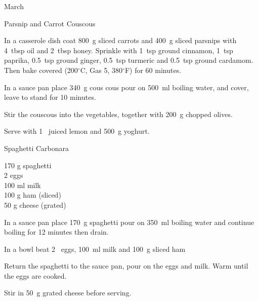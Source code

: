 \begin{menu}{March}
\begin{recipe}{2}{Parsnip and Carrot Couscous}
    \begin{instructions}
    \item 
        In a casserole dish coat
        800~g sliced carrots
        and
        400~g sliced parsnips
        with
        4~tbsp  oil
        and
        2~tbsp  honey.
        Sprinkle with
        1~tsp  ground cinnamon,
        1~tsp  paprika,
        0.5~tsp  ground ginger,
        0.5~tsp  turmeric
        and
        0.5~tsp  ground cardamom.
        Then bake covered
        (200$^{\circ}$C, Gas 5, 380$^{\circ}$F)
        for 60 minutes.
      \item 
    In a
    sauce pan 
    place
    340~g  cous cous
    pour on
    500~ml  boiling water,
    and cover, leave to stand for 10 minutes.
  \item 
        Stir the couscous into the vegetables,
        together with
        200~g chopped olives.
      \item 
        Serve with 1~ juiced lemon
        and
        500~g  yoghurt.
      
    \end{instructions}
    \end{recipe}%
  
    \begin{recipe}{1}{Spaghetti Carbonara}%
		\begin{ingredients}
		170 g spaghetti  \\
	2  eggs  \\
	100 ml milk  \\
	100 g ham (sliced) \\
	50 g cheese (grated) \\
	
		\end{ingredients}
	
	
	
    \begin{instructions}
    \item 
    In a
    sauce pan
    place
    170~g  spaghetti
    pour on
    350~ml  boiling water and continue boiling for 12 minutes then drain.
  \item 
        In a bowl beat
        2~  eggs,
        100~ml  milk
        and
        100~g sliced ham\item 
        Return the spaghetti to the sauce pan,
        pour on the eggs and milk.
        Warm until the eggs are cooked.
      \item 
        Stir in
        50~g grated cheese
        before serving.
      
    \end{instructions}
    \end{recipe}%
  
    \clearpage
    \end{menu}
	
